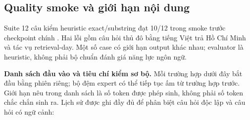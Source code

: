 \subsection{Quality smoke và giới hạn nội dung}

Suite 12 câu kiểm heuristic exact/substring đạt 10/12 trong smoke trước checkpoint chính \cite{exp_smoke_validation}. Hai lỗi gồm câu hỏi thủ đô bằng tiếng Việt trả Hồ Chí Minh và tác vụ retrieval-day. Một số case có giới hạn output khác nhau; evaluator là heuristic, không phải bộ chuẩn đánh giá năng lực ngôn ngữ.

\textbf{Danh sách đầu vào và tiêu chí kiểm sơ bộ.} Mỗi trường hợp dưới đây bắt đầu bằng phiên riêng; bộ đệm expert có thể tiếp tục ấm từ trường hợp trước. Giới hạn nêu trong danh sách là số token được phép sinh, không phải số token chắc chắn sinh ra. Lịch sử được ghi đầy đủ để phân biệt câu hỏi độc lập và câu hỏi có ngữ cảnh:

